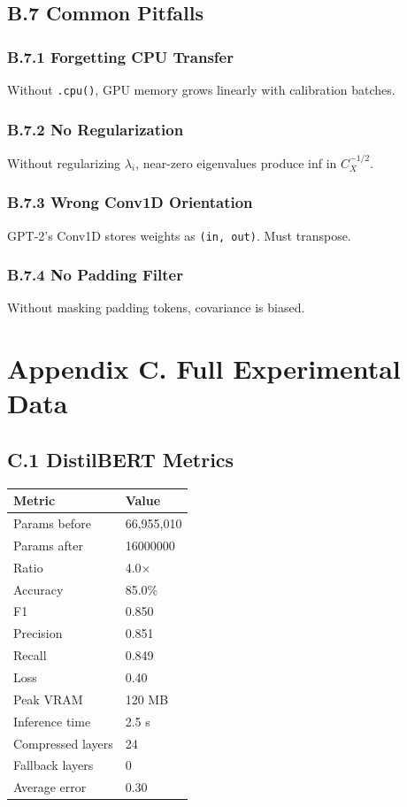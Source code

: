 \subsection{B.7 Common Pitfalls}

\subsubsection{B.7.1 Forgetting CPU Transfer}

Without \texttt{.cpu()}, GPU memory grows linearly with calibration batches.

\subsubsection{B.7.2 No Regularization}

Without regularizing $\lambda_i$, near-zero eigenvalues produce inf in 
$C_X^{-1/2}$.

\subsubsection{B.7.3 Wrong Conv1D Orientation}

GPT-2's Conv1D stores weights as \texttt{(in, out)}. Must transpose.

\subsubsection{B.7.4 No Padding Filter}

Without masking padding tokens, covariance is biased.


\section{Appendix C. Full Experimental Data}

\subsection{C.1 DistilBERT Metrics}

\begin{table}[H]
\centering
\small
\begin{tabular}{ll}
\toprule
\textbf{Metric} & \textbf{Value} \\
\midrule
Params before & 66,955,010 \\
Params after & 16000000 \\
Ratio & 4.0$\times$ \\
Accuracy & 85.0\% \\
F1 & 0.850 \\
Precision & 0.851 \\
Recall & 0.849 \\
Loss & 0.40 \\
Peak VRAM & 120 MB \\
Inference time & 2.5 s \\
Compressed layers & 24 \\
Fallback layers & 0 \\
Average error & 0.30 \\
\bottomrule
\end{tabular}
\end{table}


